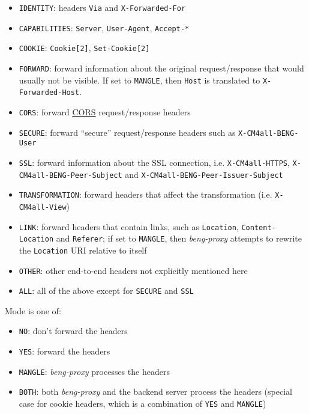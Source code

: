 \documentclass[a4paper,12pt]{article}
\begin{document}
\begin{itemize}
\item \texttt{IDENTITY}: headers \texttt{Via} and
  \texttt{X-Forwarded-For}
\item \texttt{CAPABILITIES}: \texttt{Server}, \texttt{User-Agent},
  \texttt{Accept-*}
\item \texttt{COOKIE}: \texttt{Cookie[2]}, \texttt{Set-Cookie[2]}

\item \texttt{FORWARD}: forward information about the original
  request/response that would usually not be visible.  If set to
  \verb|MANGLE|, then \texttt{Host} is translated to
  \texttt{X-Forwarded-Host}.

\item \texttt{CORS}: forward
  \href{http://www.w3.org/TR/cors/#syntax}{CORS} request/response
  headers

\item \texttt{SECURE}: forward ``secure'' request/response headers
  such as \texttt{X-CM4all-BENG-User}

\item \texttt{SSL}: forward information about the SSL connection,
  i.e. \verb|X-CM4all-HTTPS|, \verb|X-CM4all-BENG-Peer-Subject| and
  \verb|X-CM4all-BENG-Peer-Issuer-Subject|

\item \texttt{TRANSFORMATION}: forward headers that affect the
  transformation (i.e. \texttt{X-CM4all-View})

\item \texttt{LINK}: forward headers that contain links, such as
  \texttt{Location}, \texttt{Content-Location} and \texttt{Referer};
  if set to \verb|MANGLE|, then \emph{beng-proxy} attempts to rewrite
  the \texttt{Location} URI relative to itself

\item \texttt{OTHER}: other end-to-end headers not explicitly
  mentioned here

\item \texttt{ALL}: all of the above except for \texttt{SECURE} and
  \texttt{SSL}

\end{itemize}

Mode is one of:

\begin{itemize}
\item \texttt{NO}: don't forward the headers
\item \texttt{YES}: forward the headers
\item \texttt{MANGLE}: \emph{beng-proxy} processes the headers
\item \texttt{BOTH}: both \emph{beng-proxy} and the backend server
  process the headers (special case for cookie headers, which is a
  combination of \texttt{YES} and \texttt{MANGLE})
\end{itemize}
\end{document}
